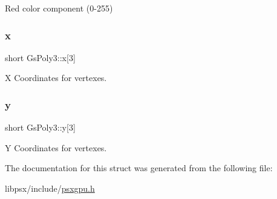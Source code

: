 Red color component (0-\/255) 

\mbox{\label{structGsPoly3_afb69db87ee5f1fd299a9aaeb14f55d2d}} 
\subsubsection{\texorpdfstring{x}{x}}
{\footnotesize\ttfamily short Gs\+Poly3\+::x\mbox{[}3\mbox{]}}



X Coordinates for vertexes. 

\mbox{\label{structGsPoly3_ab05b0a5a5e8d5bccfd03b5e1f15668a2}} 
\subsubsection{\texorpdfstring{y}{y}}
{\footnotesize\ttfamily short Gs\+Poly3\+::y\mbox{[}3\mbox{]}}



Y Coordinates for vertexes. 



The documentation for this struct was generated from the following file\+:\begin{DoxyCompactItemize}
\item 
libpsx/include/\hyperlink{psxgpu_8h}{psxgpu.\+h}\end{DoxyCompactItemize}
